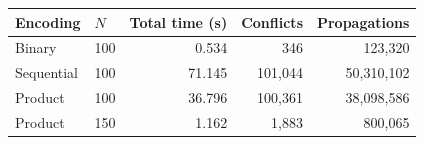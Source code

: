 \begin{tabular}{@{}llrrr@{}}
\toprule
Encoding & $N$ & Total time (s) & Conflicts & Propagations \\ \midrule
Binary & 100 & 0.534 & 346 & 123,320 \\
Sequential & 100 & 71.145 & 101,044 & 50,310,102 \\
Product & 100 & 36.796 & 100,361 & 38,098,586 \\
Product & 150 & 1.162 & 1,883 & 800,065 \\
\bottomrule
\end{tabular}
